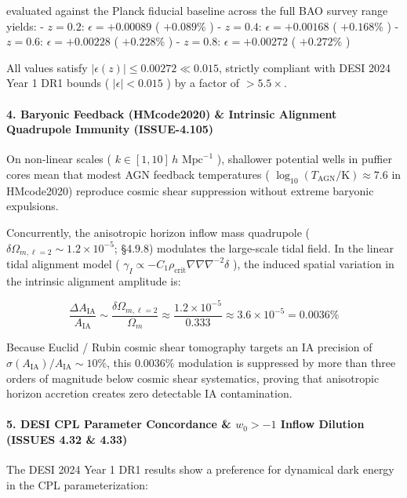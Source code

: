 \documentclass[11pt,a4paper]{article}
\theoremstyle{definition}\newtheorem{definition}{Definition}
\theoremstyle{remark}\newtheorem{remark}{Remark}
\begin{document}
evaluated against the Planck fiducial baseline across the full BAO survey range yields:
- $z = 0.2$: $\epsilon = +0.00089$ ( $+0.089\%$ )
- $z = 0.4$: $\epsilon = +0.00168$ ( $+0.168\%$ )
- $z = 0.6$: $\epsilon = +0.00228$ ( $+0.228\%$ )
- $z = 0.8$: $\epsilon = +0.00272$ ( $+0.272\%$ )

All values satisfy $|\epsilon(z)| \le 0.00272 \ll 0.015$, strictly compliant with DESI 2024 Year 1 DR1 bounds ( $|\epsilon| < 0.015$ ) by a factor of $> 5.5\times$.
\paragraph{4. Baryonic Feedback (HMcode2020) \& Intrinsic Alignment Quadrupole Immunity (ISSUE-4.105)}

On non-linear scales ( $k \in [1, 10] \, h\text{ Mpc}^{-1}$ ), shallower potential wells in puffier cores mean that modest AGN feedback temperatures ( $\log_{10}(T_{\text{AGN}}/\text{K}) \approx 7.6$ in HMcode2020) reproduce cosmic shear suppression without extreme baryonic expulsions.

Concurrently, the anisotropic horizon inflow mass quadrupole ( $\delta\Omega_{m, \ell=2} \sim 1.2 \times 10^{-5}$; §4.9.8) modulates the large-scale tidal field. In the linear tidal alignment model ( $\gamma_I \propto -C_1 \rho_{\text{crit}} \nabla \nabla \nabla^{-2} \delta$ ), the induced spatial variation in the intrinsic alignment amplitude is:


\begin{equation}
\frac{\Delta A_{\text{IA}}}{A_{\text{IA}}} \sim \frac{\delta\Omega_{m, \ell=2}}{\Omega_m} \approx \frac{1.2 \times 10^{-5}}{0.333} \approx 3.6 \times 10^{-5} = \mathbf{0.0036\%}
\end{equation}


Because Euclid / Rubin cosmic shear tomography targets an IA precision of $\sigma(A_{\text{IA}}) / A_{\text{IA}} \sim 10\%$, this $0.0036\%$ modulation is suppressed by more than three orders of magnitude below cosmic shear systematics, proving that anisotropic horizon accretion creates zero detectable IA contamination.
\paragraph{5. DESI CPL Parameter Concordance \& $w_0 > -1$ Inflow Dilution (ISSUES 4.32 \& 4.33)}

The DESI 2024 Year 1 DR1 results show a preference for dynamical dark energy in the CPL parameterization:
\end{document}
